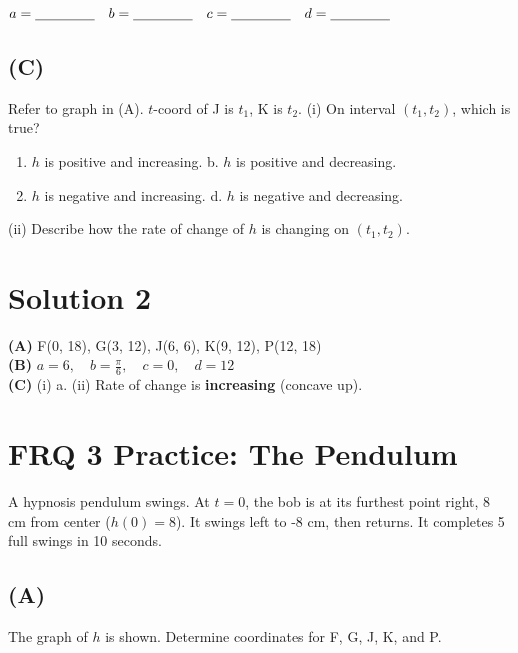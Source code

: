 \documentclass[12pt]{article}
\begin{document}
\vspace{0.5em}
$a = \underline{\hspace{1.5cm}} \quad b = \underline{\hspace{1.5cm}} \quad c = \underline{\hspace{1.5cm}} \quad d = \underline{\hspace{1.5cm}}$

\subsection*{(C)}
Refer to graph in (A). $t$-coord of J is $t_1$, K is $t_2$.
(i) On interval $(t_1, t_2)$, which is true?
\begin{enumerate}[label=\alph*.]
    \item $h$ is positive and increasing. \hfill b. $h$ is positive and decreasing.
    \item $h$ is negative and increasing. \hfill d. $h$ is negative and decreasing.
\end{enumerate}
(ii) Describe how the rate of change of $h$ is changing on $(t_1, t_2)$.
\vspace{1.5cm}

\newpage
\section*{Solution 2}
\textbf{(A)} F(0, 18), G(3, 12), J(6, 6), K(9, 12), P(12, 18) \\
\textbf{(B)} $a = 6, \quad b = \frac{\pi}{6}, \quad c = 0, \quad d = 12$ \\
\textbf{(C)} (i) a. (ii) Rate of change is \textbf{increasing} (concave up).

\newpage

\section*{FRQ 3 Practice: The Pendulum}
A hypnosis pendulum swings. At $t=0$, the bob is at its furthest point right, 8 cm from center ($h(0)=8$). It swings left to -8 cm, then returns. It completes 5 full swings in 10 seconds.

\subsection*{(A)}
The graph of $h$ is shown. Determine coordinates for F, G, J, K, and P.
\end{document}
